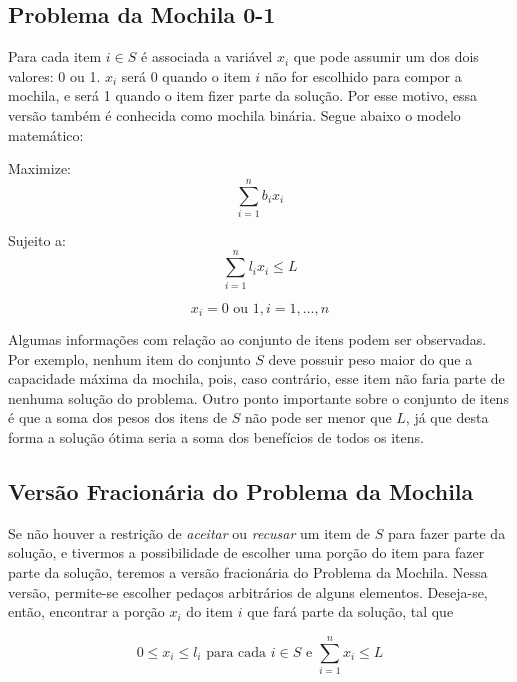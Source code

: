 \subsection{Problema da Mochila 0-1} \label{m01}

Para cada item $i \in S$ é associada a variável $x_i$ que pode assumir um dos dois valores: 0 ou 1. $x_i$ será 0 quando o item $i$ não for escolhido para compor a mochila, e será 1 quando o item fizer parte da solução. Por esse motivo, essa versão também é conhecida como mochila binária. Segue abaixo o modelo matemático:

\hspace*{3.0cm} Maximize:
\begin{equation}
 \sum_{i=1}^n b_i x_i 
\end{equation} 

\hspace*{3.0cm} Sujeito a:
\begin{equation}
 \sum_{i=1}^n l_i x_i  \leq L
\end{equation} 

\begin{equation}
 x_i=0 \textrm{ ou } 1, i=1,...,n 
\end{equation} 

Algumas informações com relação ao conjunto de itens podem ser observadas. Por exemplo, nenhum item do conjunto $S$ deve possuir peso maior do que a capacidade máxima da mochila, pois, caso contrário, esse item não faria parte de nenhuma solução do problema. Outro ponto importante sobre o conjunto de itens é que a soma dos pesos dos itens de $S$ não pode ser menor que $L$, já que desta forma a solução ótima seria a soma dos benefícios de todos os itens. 

\subsection{Versão Fracionária do Problema da Mochila} \label{frac}

Se não houver a restrição de {\it aceitar} ou {\it recusar} um item de $S$ para fazer parte da solução, e tivermos a possibilidade  de escolher uma porção do item para fazer parte da solução, teremos a versão fracionária do Problema da Mochila. Nessa versão, permite-se escolher pedaços arbitrários de alguns elementos. Deseja-se, então, encontrar a porção $x_i$ do item $i$ que fará parte da solução, tal que

\begin{equation}
 0 \leq x_i \leq l_i \textrm{ para cada } i\in S \textrm{ e } \sum_{i=1}^n x_i \leq L 
\end{equation}

